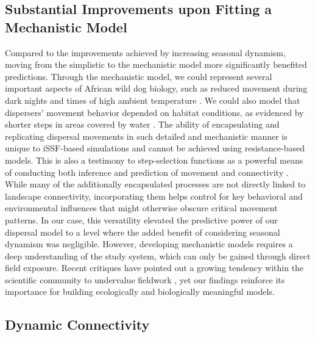 \documentclass[abstract=on,10pt,a4paper,bibliography=totocnumbered]{article}
\begin{document}
\subsection{Substantial Improvements upon Fitting a Mechanistic Model}

Compared to the improvements achieved by increasing seasonal dynamism, moving
from the simplistic to the mechanistic model more significantly benefited
predictions. Through the mechanistic model, we could represent several important
aspects of African wild dog biology, such as reduced movement during dark nights
\citep{Cozzi.2013} and times of high ambient temperature \citep{Rabaiotti.2021}.
We could also model that dispersers' movement behavior depended on habitat
conditions, as evidenced by shorter steps in areas covered by water
\citep{Hofmann.2023}. The ability of encapsulating and replicating dispersal
movements in such detailed and mechanistic manner is unique to iSSF-based
simulations and cannot be achieved using resistance-based models. This is also a
testimony to step-selection functions as a powerful means of conducting both
inference and prediction of movement and connectivity \citep{Hofmann.2023,
Forrest.2024}. While many of the additionally encapsulated processes are not
directly linked to landscape connectivity, incorporating them helps control for
key behavioral and environmental influences that might otherwise obscure
critical movement patterns. In our case, this versatility elevated the
predictive power of our dispersal model to a level where the added benefit of
considering seasonal dynamism was negligible. However, developing mechanistic
models requires a deep understanding of the study system, which can only be
gained through direct field exposure. Recent critiques have pointed out a
growing tendency within the scientific community to undervalue fieldwork
\citep{Rafiq.2024}, yet our findings reinforce its importance for building
ecologically and biologically meaningful models.

\subsection{Dynamic Connectivity}
\end{document}
